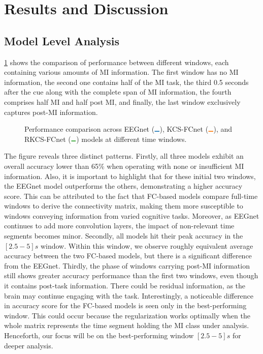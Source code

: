 \section{Results and Discussion}

\subsection{Model Level Analysis}

\cref{fig:acc_windows} shows the comparison of performance between different windows, each containing various amounts of MI information. The first window has no MI information, the second one contains half of the MI task, the third 0.5 seconds after the cue along with the complete span of MI information, the fourth comprises half MI and half post MI, and finally, the last window exclusively captures post-MI information.

\begin{figure}[h!]
  \centering
  \resizebox{\linewidth}{!}{}
  \caption{Performance comparison across EEGnet (${\lineplot{steelblue31119180}}$), KCS-FCnet (${\lineplot{darkorange25512714}}$), and RKCS-FCnet (${\lineplot{forestgreen4416044}}$) models at different time windows.}\label{fig:acc_windows}
\end{figure}

The figure reveals three distinct patterns. Firstly, all three models exhibit an overall accuracy lower than 65\% when operating with none or insufficient MI information. Also, it is important to highlight that for these initial two windows, the EEGnet model outperforms the others, demonstrating a higher accuracy score. This can be attributed to the fact that FC-based models compare full-time windows to derive the connectivity matrix, making them more susceptible to windows conveying information from varied cognitive tasks. Moreover, as EEGnet continues to add more convolution layers, the impact of non-relevant time segments becomes minor. Secondly, all models hit their peak accuracy in the $[2.5-5]s$ window. Within this window, we observe roughly equivalent average accuracy between the two FC-based models, but there is a significant difference from the EEGnet. Thirdly, the phase of windows carrying post-MI information still shows greater accuracy performance than the first two windows, even though it contains post-task information. There could be residual information, as the brain may continue engaging with the task. Interestingly, a noticeable difference in accuracy score for the FC-based models is seen only in the best-performing window. This could occur because the regularization works optimally when the whole matrix represents the time segment holding the MI class under analysis. Henceforth, our focus will be on the best-performing window $[2.5-5]s$ for deeper analysis.

